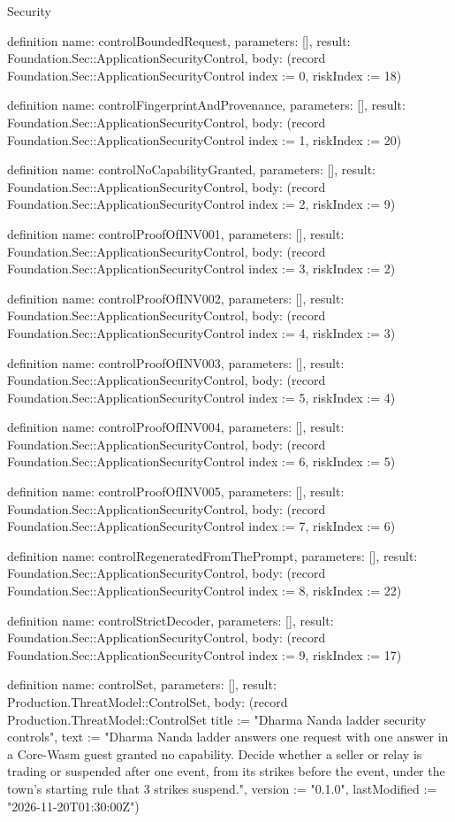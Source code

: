 \begin{lexlean}{Security}
\begin{semanticmodule}
definition{
  name: controlBoundedRequest,
  parameters: [],
  result: Foundation.Sec::ApplicationSecurityControl,
  body: (record Foundation.Sec::ApplicationSecurityControl {index := 0, riskIndex := 18})
}

definition{
  name: controlFingerprintAndProvenance,
  parameters: [],
  result: Foundation.Sec::ApplicationSecurityControl,
  body: (record Foundation.Sec::ApplicationSecurityControl {index := 1, riskIndex := 20})
}

definition{
  name: controlNoCapabilityGranted,
  parameters: [],
  result: Foundation.Sec::ApplicationSecurityControl,
  body: (record Foundation.Sec::ApplicationSecurityControl {index := 2, riskIndex := 9})
}

definition{
  name: controlProofOfINV001,
  parameters: [],
  result: Foundation.Sec::ApplicationSecurityControl,
  body: (record Foundation.Sec::ApplicationSecurityControl {index := 3, riskIndex := 2})
}

definition{
  name: controlProofOfINV002,
  parameters: [],
  result: Foundation.Sec::ApplicationSecurityControl,
  body: (record Foundation.Sec::ApplicationSecurityControl {index := 4, riskIndex := 3})
}

definition{
  name: controlProofOfINV003,
  parameters: [],
  result: Foundation.Sec::ApplicationSecurityControl,
  body: (record Foundation.Sec::ApplicationSecurityControl {index := 5, riskIndex := 4})
}

definition{
  name: controlProofOfINV004,
  parameters: [],
  result: Foundation.Sec::ApplicationSecurityControl,
  body: (record Foundation.Sec::ApplicationSecurityControl {index := 6, riskIndex := 5})
}

definition{
  name: controlProofOfINV005,
  parameters: [],
  result: Foundation.Sec::ApplicationSecurityControl,
  body: (record Foundation.Sec::ApplicationSecurityControl {index := 7, riskIndex := 6})
}

definition{
  name: controlRegeneratedFromThePrompt,
  parameters: [],
  result: Foundation.Sec::ApplicationSecurityControl,
  body: (record Foundation.Sec::ApplicationSecurityControl {index := 8, riskIndex := 22})
}

definition{
  name: controlStrictDecoder,
  parameters: [],
  result: Foundation.Sec::ApplicationSecurityControl,
  body: (record Foundation.Sec::ApplicationSecurityControl {index := 9, riskIndex := 17})
}

definition{
  name: controlSet,
  parameters: [],
  result: Production.ThreatModel::ControlSet,
  body: (record Production.ThreatModel::ControlSet {title := "Dharma Nanda ladder security controls", text := "Dharma Nanda ladder answers one request with one answer in a Core-Wasm guest granted no capability. Decide whether a seller or relay is trading or suspended after one event, from its strikes before the event, under the town's starting rule that 3 strikes suspend.", version := "0.1.0", lastModified := "2026-11-20T01:30:00Z"})
}


\end{semanticmodule}
\end{lexlean}
